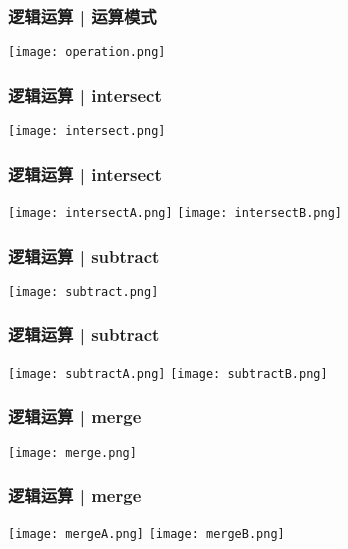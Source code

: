 \begin{frame}
  \frametitle{逻辑运算 | \alert{运算模式}}
    \begin{center}
      \texttt{[image: operation.png]}
    \end{center}
\end{frame}

\begin{frame}
  \frametitle{逻辑运算 | intersect}
    \begin{center}
      \texttt{[image: intersect.png]}
    \end{center}
\end{frame}

\begin{frame}
  \frametitle{逻辑运算 | intersect}
    \begin{center}
      \texttt{[image: intersectA.png]}
      \vspace{0.5cm}
      \texttt{[image: intersectB.png]}
    \end{center}
\end{frame}

\begin{frame}
  \frametitle{逻辑运算 | subtract}
    \begin{center}
      \texttt{[image: subtract.png]}
    \end{center}
\end{frame}

\begin{frame}
  \frametitle{逻辑运算 | subtract}
    \begin{center}
      \texttt{[image: subtractA.png]}
      \vspace{0.5cm}
      \texttt{[image: subtractB.png]}
    \end{center}
\end{frame}

\begin{frame}
  \frametitle{逻辑运算 | merge}
    \begin{center}
      \texttt{[image: merge.png]}
    \end{center}
\end{frame}

\begin{frame}
  \frametitle{逻辑运算 | merge}
    \begin{center}
      \texttt{[image: mergeA.png]}
      \vspace{0.5cm}
      \texttt{[image: mergeB.png]}
    \end{center}
\end{frame}

